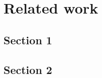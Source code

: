 
\chapter{Related work}
\label{ch:relatedwork}

\section{Section 1}
\label{sec:relsec1}

\section{Section 2}
\label{sec:relsec2}

